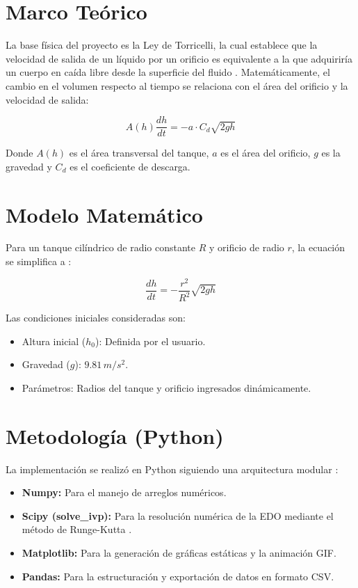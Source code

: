 \documentclass{cys}
\begin{document}
	\section{Marco Teórico}
	\label{sec:marco}
	La base física del proyecto es la Ley de Torricelli, la cual establece que la velocidad de salida de un líquido por un orificio es equivalente a la que adquiriría un cuerpo en caída libre desde la superficie del fluido \cite{torricelli2026}. Matemáticamente, el cambio en el volumen respecto al tiempo se relaciona con el área del orificio y la velocidad de salida:
	
	\begin{equation}
		A(h) \frac{dh}{dt} = -a \cdot C_d \sqrt{2gh}
	\end{equation}
	
	Donde $A(h)$ es el área transversal del tanque, $a$ es el área del orificio, $g$ es la gravedad y $C_d$ es el coeficiente de descarga.
	
	\section{Modelo Matemático}
	\label{sec:modelo}
	Para un tanque cilíndrico de radio constante $R$ y orificio de radio $r$, la ecuación se simplifica a \cite{torricelli2026}:
	
	\begin{equation}
		\frac{dh}{dt} = -\frac{r^2}{R^2} \sqrt{2gh}
	\end{equation}
	
	Las condiciones iniciales consideradas son:
	\begin{itemize}
		\item Altura inicial ($h_0$): Definida por el usuario.
		\item Gravedad ($g$): $9.81 \, m/s^2$.
		\item Parámetros: Radios del tanque y orificio ingresados dinámicamente.
	\end{itemize}
	
	\section{Metodología (Python)}
	\label{sec:metodologia}
	La implementación se realizó en Python siguiendo una arquitectura modular \cite{upchiapas2026}:
	
	\begin{itemize}
		\item \textbf{Numpy:} Para el manejo de arreglos numéricos.
		\item \textbf{Scipy (solve\_ivp):} Para la resolución numérica de la EDO mediante el método de Runge-Kutta \cite{scipy2026}.
		\item \textbf{Matplotlib:} Para la generación de gráficas estáticas y la animación GIF.
		\item \textbf{Pandas:} Para la estructuración y exportación de datos en formato CSV.
	\end{itemize}
	
\end{document}
